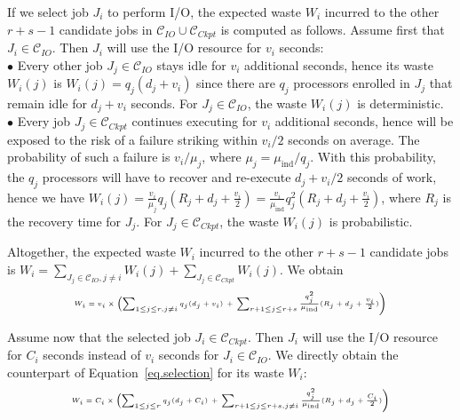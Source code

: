 \documentclass[conference,nofonttune]{IEEEtran}
\newcommand{\muind}{\mu_{\text{ind}}}
\newcommand{\ckpt}[1]{C_{#1}}
\newcommand{\reco}[1]{R_{#1}}
\newcommand{\wap}[1]{W_{#1}}
\newcommand{\wapp}[2]{W_{#1}(#2)}
\newcommand{\Catiocat}{\mathcal{C}_{IO}\xspace}
\newcommand{\Catckptcat}{\mathcal{C}_{Ckpt}\xspace}
\begin{document}
If we select job $J_{i}$ to perform I/O, the expected waste $\wap{i}$
incurred to the other $r+s-1$ candidate jobs in  $\Catiocat \cup
\Catckptcat$ is computed as follows. Assume first that $J_{i} \in \Catiocat$.
Then  $J_{i}$ will use the I/O resource for $v_{i}$ seconds:\\
$\bullet$ Every other job $J_{j} \in \Catiocat$ stays idle for $v_{i}$
  additional seconds, hence its waste $\wapp{i}{j}$ is $\wapp{i}{j} = q_{j}
  (d_{j} + v_{i})$ since there are $q_{j}$ processors enrolled in $J_{j}$ that
  remain idle for $d_{j} + v_{i}$ seconds. For $J_{j} \in \Catiocat$, the
  waste $\wapp{i}{j}$ is deterministic.\\
$\bullet$ Every job $J_{j} \in \Catckptcat$ continues executing for
  $v_{i}$ additional seconds, hence will be exposed to the risk of a failure
  striking within $v_{i}/2$ seconds on average. The probability of such
  a failure is $v_{i}/\mu_{j}$, where $\mu_{j} =
  \muind/q_{j}$. With this
  probability, the $q_{j}$ processors will have to recover and re-execute $d_{j} +
  v_{i}/2$ seconds of work, hence we have $\wapp{i}{j} =
  \frac{v_{i}}{\mu_{j} } q_{j} (\reco{j} + d_{j} + \frac{v_{i}}{2}) =
  \frac{v_{i}}{\muind} q^{2}_{j} (\reco{j} + d_{j} + \frac{v_{i}}{2})$, where
  $\reco{j}$ is the recovery time for $J_{j}$. For $J_{j} \in
  \Catckptcat$, the waste $\wapp{i}{j}$ is probabilistic.

 Altogether, the expected waste $\wap{i}$ incurred
to the other $r+s-1$ candidate jobs is
$\wap{i} = \sum_{J_{j} \in \Catiocat, j\neq i} \wapp{i}{j} + \sum_{J_{j} \in \Catckptcat} \wapp{i}{j}$.
We obtain
\begin{equation}
\label{eq.selection}
{\tiny
\begin{array}{l}
 \wap{i} =  v_{i} \times \left( \sum_{1 \leq j \leq r, j\neq i} q_{j} (d_{j} + v_{i}) \right.
 + \left. \sum_{r+1 \leq j \leq r+s}   \frac{q^{2}_{j}}{\muind} (\reco{j} + d_{j} + \frac{v_{i}}{2}) \right)
 \end{array}
 }
\end{equation}

Assume now that the selected job $J_{i} \in \Catckptcat$. Then $J_{i}$
will use the I/O resource for $\ckpt{i}$ seconds instead of $v_{i}$
seconds for $J_{i} \in \Catiocat$. We directly obtain the counterpart
of Equation~\eqref{eq.selection} for its waste $\wap{i}$:
 \begin{equation}
\label{eq.selection2}
{\tiny
 \begin{array}{l}
 \wap{i} = \ckpt{i} \times \left( \sum_{1 \leq j \leq r} q_{j} (d_{j} + \ckpt{i}) \right.
+ \left. \sum_{r+1 \leq j \leq r+s, j\neq i}   \frac{q^{2}_{j}}{\muind} (\reco{j} + d_{j} + \frac{C_{i}}{2}) \right)
 \end{array}
 }
\end{equation}
\end{document}
